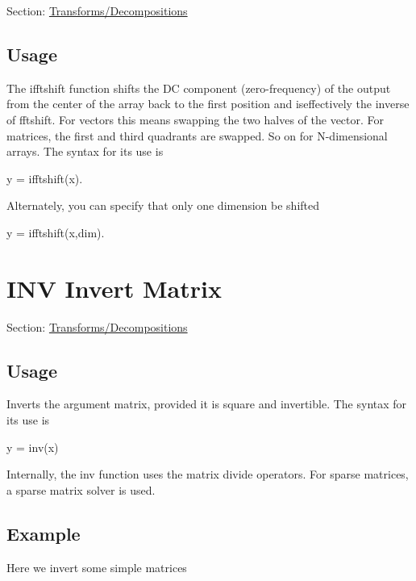 Section\-: \hyperlink{sec_transforms}{Transforms/\-Decompositions} \hypertarget{vtkwidgets_vtkxyplotwidget_Usage}{}\subsection{Usage}\label{vtkwidgets_vtkxyplotwidget_Usage}
The {\ttfamily ifftshift} function shifts the D\-C component (zero-\/frequency) of the output from the center of the array back to the first position and iseffectively the inverse of {\ttfamily fftshift}. For vectors this means swapping the two halves of the vector. For matrices, the first and third quadrants are swapped. So on for N-\/dimensional arrays. The syntax for its use is \begin{DoxyVerb}     y = ifftshift(x).
\end{DoxyVerb}
 Alternately, you can specify that only one dimension be shifted \begin{DoxyVerb}     y = ifftshift(x,dim).
\end{DoxyVerb}
 \hypertarget{transforms_inv}{}\section{I\-N\-V Invert Matrix}\label{transforms_inv}
Section\-: \hyperlink{sec_transforms}{Transforms/\-Decompositions} \hypertarget{vtkwidgets_vtkxyplotwidget_Usage}{}\subsection{Usage}\label{vtkwidgets_vtkxyplotwidget_Usage}
Inverts the argument matrix, provided it is square and invertible. The syntax for its use is \begin{DoxyVerb}   y = inv(x)
\end{DoxyVerb}
 Internally, the {\ttfamily inv} function uses the matrix divide operators. For sparse matrices, a sparse matrix solver is used. \hypertarget{variables_struct_Example}{}\subsection{Example}\label{variables_struct_Example}
Here we invert some simple matrices



